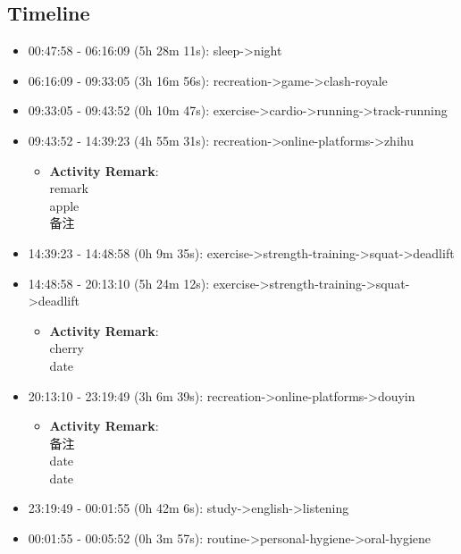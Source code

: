 \documentclass[12pt]{extarticle}
\begin{document}
{\fontsize{16}{19.2}\selectfont\subsection*{Timeline}}

\begin{itemize}[topsep=0pt, itemsep=-0.5ex]
    \item \textcolor{sleepcolor}{00:47:58 - 06:16:09 (5h 28m 11s): sleep->night}
    \item \textcolor{recreationcolor}{06:16:09 - 09:33:05 (3h 16m 56s): recreation->game->clash-royale}
    \item \textcolor{exercisecolor}{09:33:05 - 09:43:52 (0h 10m 47s): exercise->cardio->running->track-running}
    \item \textcolor{recreationcolor}{09:43:52 - 14:39:23 (4h 55m 31s): recreation->online-platforms->zhihu}
    \begin{itemize}[topsep=0pt, itemsep=-0.5ex]
        \item \textbf{Activity Remark}:\\
        remark\\
apple\\
备注
    \end{itemize}
    \item \textcolor{exercisecolor}{14:39:23 - 14:48:58 (0h 9m 35s): exercise->strength-training->squat->deadlift}
    \item \textcolor{exercisecolor}{14:48:58 - 20:13:10 (5h 24m 12s): exercise->strength-training->squat->deadlift}
    \begin{itemize}[topsep=0pt, itemsep=-0.5ex]
        \item \textbf{Activity Remark}:\\
        cherry\\
date
    \end{itemize}
    \item \textcolor{recreationcolor}{20:13:10 - 23:19:49 (3h 6m 39s): recreation->online-platforms->douyin}
    \begin{itemize}[topsep=0pt, itemsep=-0.5ex]
        \item \textbf{Activity Remark}:\\
        备注\\
date\\
date
    \end{itemize}
    \item \textcolor{studycolor}{23:19:49 - 00:01:55 (0h 42m 6s): study->english->listening}
    \item \textcolor{routinecolor}{00:01:55 - 00:05:52 (0h 3m 57s): routine->personal-hygiene->oral-hygiene}

\end{itemize}
\end{document}
